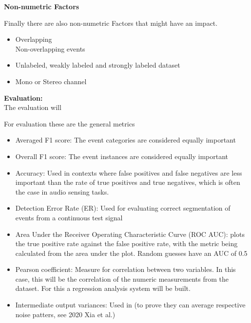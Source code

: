 	\textbf{Non-numetric Factors}
	
	Finally there are also non-numetric Factors that might have an impact. 
	\begin{itemize}
		\item Overlapping\\Non-overlapping events
		\item Unlabeled, weakly labeled and strongly labeled dataset
		\item Mono or Stereo channel
	\end{itemize}
	
	\textbf{Evaluation:}\\
	
	The evaluation will 
	
	For evaluation these are the general metrics
	
	\begin{itemize}
		\item Averaged F1 score: The event categories are considered equally important \cite{phan2019unifying}
		\item Overall F1 score: The event instances are considered equally important \cite{phan2019unifying}
		\item Accuracy: Used in contexts where false positives and false negatives are less important than the rate of true positives and true negatives, which is often the case in audio sensing tasks.
		\item Detection Error Rate (ER): Used for evaluating correct segmentation of events from a continuous test signal \cite{phan2019unifying}
		\item Area Under the Receiver Operating Characteristic Curve (ROC AUC): plots the true positive rate against the false positive rate, with the metric being calculated from the area under the plot. Random guesses have an AUC of 0.5 \cite{deshmukh2020multi}
		\item Pearson coefficient: Measure for correlation between two variables. In this case, this will be the correlation of the numeric measurements from the dataset. For this a regression analysis system will be built.
		\item Intermediate output variances: Used in \cite{xia2019multi}  (to prove they can average respective noise patters, see 2020 Xia et al.)

\end{itemize}
